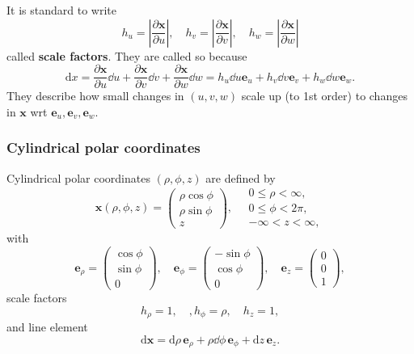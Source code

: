 It is standard to write 
\[
    h_u = \left| \frac{\partial \mathbf{x}}{\partial u}  \right| ,\quad h_v=\left| \frac{\partial \mathbf{x}}{\partial v}  \right|,\quad h_w=\left| \frac{\partial \mathbf{x}}{\partial w}  \right|
\]
called \textbf{scale factors}. They are called so because 
\[
    \mathrm{d} x = \frac{\partial \mathbf{x}}{\partial u}\dd u+ \frac{\partial \mathbf{x}}{\partial v}\dd v+\frac{\partial \mathbf{x}}{\partial w}\dd w=h_u \dd u \mathbf{e}_u+h_v \dd v \mathbf{e}_v+h_w \dd w \mathbf{e}_w.
\]
They describe how small changes in $ (u,v,w) $ scale up (to 1st order) to changes in $\mathbf{x}$ wrt $ \mathbf{e}_u,\mathbf{e}_v,\mathbf{e}_w $.

\subsubsection*{Cylindrical polar coordinates}
Cylindrical polar coordinates $ (\rho,\phi,z) $ are defined by 
\[
    \mathbf{x}(\rho,\phi,z)= \begin{pmatrix}
        \rho\cos \phi \\ \rho \sin \phi \\ z
    \end{pmatrix}, \quad\begin{matrix}
        0\le \rho< \infty, \\ 0\le \phi<2\pi,\\ -\infty <z<\infty,
    \end{matrix}
\]
with 
\[
    \mathbf{e}_\rho=\begin{pmatrix}
        \cos \phi \\ \sin \phi \\ 0
    \end{pmatrix},\quad
    \mathbf{e}_\phi=\begin{pmatrix}
        -\sin\phi \\ \cos \phi \\ 0
    \end{pmatrix},\quad
    \mathbf{e}_z=\begin{pmatrix}
        0 \\ 0 \\ 1
    \end{pmatrix},
\]
scale factors
\[
    h_\rho=1,\quad,h_\phi=\rho,\quad h_z=1,
\]
and line element
\[
    \mathrm{d} \mathbf{x} = \mathrm{d} \rho\, \mathbf{e}_\rho+\rho\dd \phi \, \mathbf{e}_\phi+\mathrm{d} z \, \mathbf{e}_z.
\]
